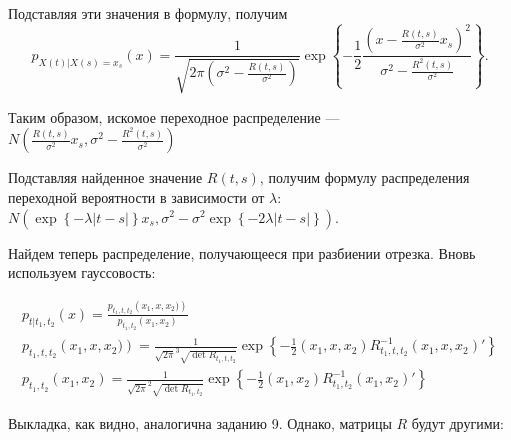 \documentclass[12pt, a4paper]{article}
\begin{document}
Подставляя эти значения в формулу, получим
\[
	 p_{X(t)|X(s)=x_s}(x) = 
	 \frac{1}{\sqrt{2\pi \left( \sigma^2 - \frac{R(t,s)}{\sigma^2} \right) }}
	 \exp\left\{ - \frac{1}{2} 
	 \frac{\left( x - \frac{R(t,s)}{\sigma^2}x_s \right) ^ 2}
	 	{\sigma^2-\frac{R^2(t,s)}{\sigma^2}} \right\}.
\]

Таким образом, искомое переходное распределение --- $N\left(\frac{R(t,s)}{\sigma^2}x_s,\sigma^2-\frac{R^2(t,s)}{\sigma^2}\right)$

Подставляя найденное значение $R(t,s)$, получим формулу распределения переходной вероятности в зависимости от $\lambda$: 
$N\left({\exp\left\{ -\lambda |t-s| \right\}}x_s,\sigma^2-\sigma^2  
\exp\left\{ -2\lambda |t-s| \right\} \right).$

Найдем теперь распределение, получающееся при разбиении отрезка.
Вновь используем гауссовость:

\begin{gather*}
 p_{t\left|t_1,t_2\right. }\left( x\right) = 
	\frac{p_{t_1,t,t_2} \left( x_1,x,x_2) \right) } 
	     {p_{t_1,t_2} \left( x_1,x_2 \right) }\\
	p_{t_1,t,t_2} \left( x_1,x,x_2) \right) = 
			\frac{1}{\sqrt{2\pi }^3 \sqrt{\det{R_{t_1,t,t_2}}} }
			\exp\left\{ -\frac 12 (x_1,x,x_2)R_{t_1,t,t_2}^{-1}(x_1,x,x_2)' \right\} \\
		p_{t_1,t_2} \left( x_1,x_2 \right) = 
			\frac{1}{\sqrt{2\pi}^2\sqrt{\det{R_{t_1,t_2}}}}
			\exp\left\{ -\frac 12 (x_1,x_2)R_{t_1,t_2}^{-1}(x_1,x_2)' \right\}	
\end{gather*}

Выкладка, как видно, аналогична заданию 9. Однако, матрицы $R$ будут другими:
\end{document}
